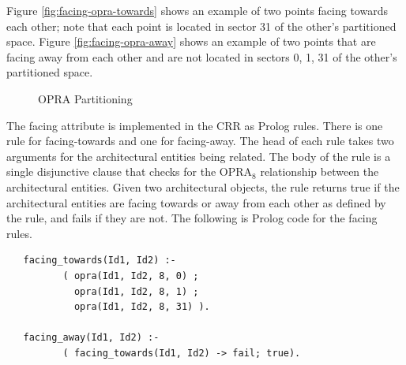 \documentclass[12pt]{ucthesis}
\begin{document}

Figure \ref{fig:facing-opra-towards} shows an example of two points facing towards each other; note that each point is located in sector 31 of the other's partitioned space.  Figure \ref{fig:facing-opra-away} shows an example of two points that are facing away from each other and are not located in sectors 0, 1, 31 of the other's partitioned space. 

\begin{figure}[H]
 \centering
  \hspace{10 mm}
 \caption{OPRA Partitioning }
\label{opra-facing}
\end{figure}

The facing attribute is implemented in the CRR as Prolog rules. There is one rule for facing-towards and one for facing-away. The head of each rule takes two arguments for the architectural entities being related. The body of the rule is a single disjunctive clause that checks for the OPRA$_{8}$ relationship between the architectural entities. Given two architectural objects, the rule returns true if the architectural entities are facing towards or away from each other as defined by the rule, and fails if they are not. The following is Prolog code for the facing rules.

\begin{verbatim}
   facing_towards(Id1, Id2) :- 
          ( opra(Id1, Id2, 8, 0) ;
            opra(Id1, Id2, 8, 1) ;
            opra(Id1, Id2, 8, 31) ).
                                 
   facing_away(Id1, Id2) :- 
          ( facing_towards(Id1, Id2) -> fail; true).                     
\end{verbatim}
\end{document}
